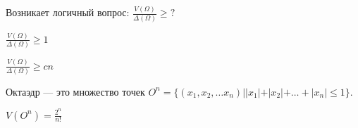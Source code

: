 Возникает логичный вопрос: \(\frac{V(\Omega)}{\Delta(\Omega)} \ge ?\)


\begin{theorem}
    \(\frac{V(\Omega)}{\Delta(\Omega)} \ge 1\)
\end{theorem}
\begin{theorem}
    \(\frac{V(\Omega)}{\Delta(\Omega)} \ge cn\)
\end{theorem}

\begin{definition}
    Октаэдр --- это множество точек \(O^n = \{(x_1, x_2, \dots x_n) | |x_1| + |x_2| + \dots + |x_n| \le 1\}\).
\end{definition}

\begin{proposition}
    \(V(O^n) = \frac{2^n}{n!}\)
\end{proposition}